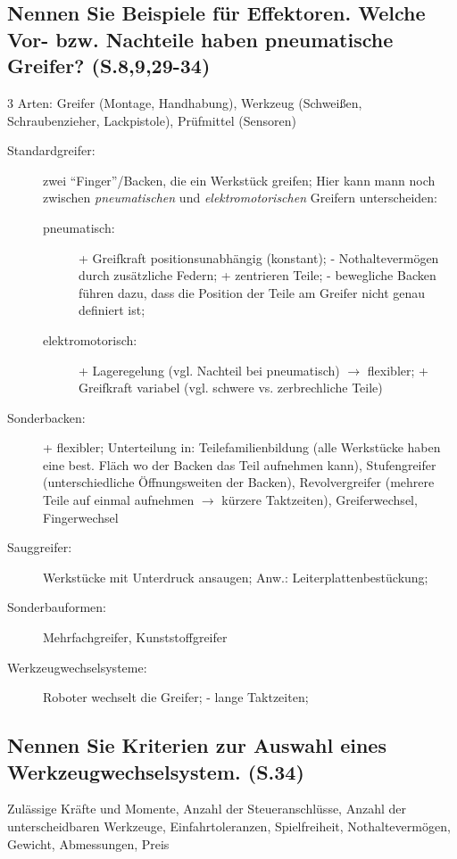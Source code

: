\subsection{Nennen Sie Beispiele für Effektoren. Welche Vor- bzw. Nachteile haben pneumatische 
Greifer? (S.8,9,29-34)}
3 Arten: Greifer (Montage, Handhabung), Werkzeug (Schweißen, Schraubenzieher, Lackpistole), 
Prüfmittel (Sensoren)
\begin{description}
\item[Standardgreifer:] zwei ``Finger''/Backen, die ein Werkstück greifen; Hier kann mann noch
  zwischen \emph{pneumatischen} und \emph{elektromotorischen} Greifern unterscheiden:
  \begin{description}
    \item[pneumatisch:] + Greifkraft positionsunabhängig (konstant); - Nothaltevermögen durch
      zusätzliche Federn; + zentrieren Teile; - bewegliche Backen führen dazu, dass die 
      Position der Teile am Greifer nicht genau definiert ist;
    \item[elektromotorisch:] + Lageregelung (vgl. Nachteil bei pneumatisch) $\rightarrow$ 
      flexibler; + Greifkraft variabel (vgl. schwere vs. zerbrechliche Teile)
  \end{description}
\item[Sonderbacken:] + flexibler; Unterteilung in: Teilefamilienbildung (alle Werkstücke haben 
  eine best. Fläch wo der Backen das Teil aufnehmen kann), Stufengreifer (unterschiedliche
  Öffnungsweiten der Backen), Revolvergreifer (mehrere Teile auf einmal aufnehmen 
  $\rightarrow$ kürzere Taktzeiten), Greiferwechsel, Fingerwechsel
\item[Sauggreifer:] Werkstücke mit Unterdruck ansaugen; Anw.: Leiterplattenbestückung;
\item[Sonderbauformen:] Mehrfachgreifer, Kunststoffgreifer
\item[Werkzeugwechselsysteme:] Roboter wechselt die Greifer; - lange Taktzeiten;
\end{description}

\subsection{Nennen Sie Kriterien zur Auswahl eines Werkzeugwechselsystem. (S.34)}
Zulässige Kräfte und Momente, Anzahl der Steueranschlüsse, Anzahl der unterscheidbaren 
Werkzeuge, Einfahrtoleranzen, Spielfreiheit, Nothaltevermögen, Gewicht, Abmessungen, Preis

